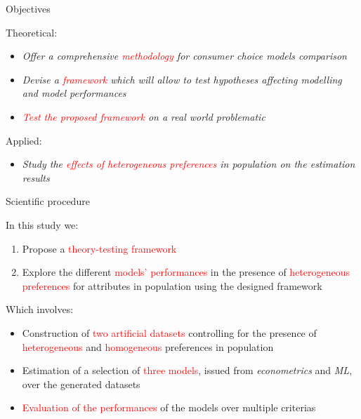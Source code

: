 \documentclass[11pt,ignorenonframetext,]{beamer}
\providecommand{\tightlist}{%
  \setlength{\itemsep}{0pt}\setlength{\parskip}{0pt}}
\begin{document}
\begin{frame}{Objectives}
\protect\hypertarget{objectives}{}

Theoretical:

\begin{itemize}
\tightlist
\item
  \emph{Offer a comprehensive \textcolor{red}{methodology} for consumer
  choice models comparison}
\item
  \emph{Devise a \textcolor{red}{framework} which will allow to test
  hypotheses affecting modelling and model performances}
\item
  \emph{\textcolor{red}{Test the proposed framework} on a real world
  problematic}
\end{itemize}

Applied:

\begin{itemize}
\tightlist
\item
  \emph{Study the \textcolor{red}{effects of heterogeneous preferences}
  in population on the estimation results}
\end{itemize}

\end{frame}

\begin{frame}{Scientific procedure}
\protect\hypertarget{scientific-procedure}{}

In this study we:

\begin{enumerate}
\tightlist
\item
  Propose a \textcolor{red}{theory-testing framework}
\item
  Explore the different \textcolor{red}{models' performances} in the
  presence of \textcolor{red}{heterogeneous preferences} for attributes
  in population using the designed framework
\end{enumerate}

Which involves:

\begin{itemize}
\tightlist
\item
  Construction of \textcolor{red}{two artificial datasets} controlling
  for the presence of \textcolor{red}{heterogeneous} and
  \textcolor{red}{homogeneous} preferences in population
\item
  Estimation of a selection of \textcolor{red}{three models}, issued
  from \emph{econometrics} and \emph{ML}, over the generated datasets
\item
  \textcolor{red}{Evaluation of the performances} of the models over
  multiple criterias
\end{itemize}

\end{frame}
\end{document}
